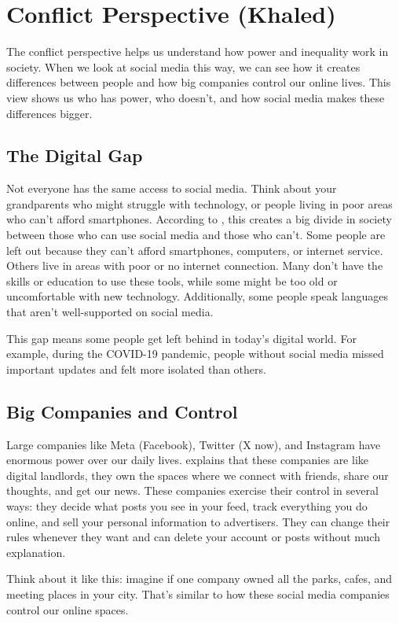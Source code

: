\documentclass{article}
\begin{document}
\newpage
\section{Conflict Perspective (Khaled)}
The conflict perspective helps us understand how power and inequality work in society. When we look at social media this way, we can see how it creates differences between people and how big companies control our online lives. This view shows us who has power, who doesn't, and how social media makes these differences bigger.

\subsection{The Digital Gap}
Not everyone has the same access to social media. Think about your grandparents who might struggle with technology, or people living in poor areas who can't afford smartphones. According to \citet{ye2023}, this creates a big divide in society between those who can use social media and those who can't. Some people are left out because they can't afford smartphones, computers, or internet service. Others live in areas with poor or no internet connection. Many don't have the skills or education to use these tools, while some might be too old or uncomfortable with new technology. Additionally, some people speak languages that aren't well-supported on social media.

This gap means some people get left behind in today's digital world. For example, during the COVID-19 pandemic, people without social media missed important updates and felt more isolated than others.

\subsection{Big Companies and Control}
Large companies like Meta (Facebook), Twitter (X now), and Instagram have enormous power over our daily lives. \citet{azizi2019} explains that these companies are like digital landlords, they own the spaces where we connect with friends, share our thoughts, and get our news. These companies exercise their control in several ways: they decide what posts you see in your feed, track everything you do online, and sell your personal information to advertisers. They can change their rules whenever they want and can delete your account or posts without much explanation.

Think about it like this: imagine if one company owned all the parks, cafes, and meeting places in your city. That's similar to how these social media companies control our online spaces.
\end{document}
